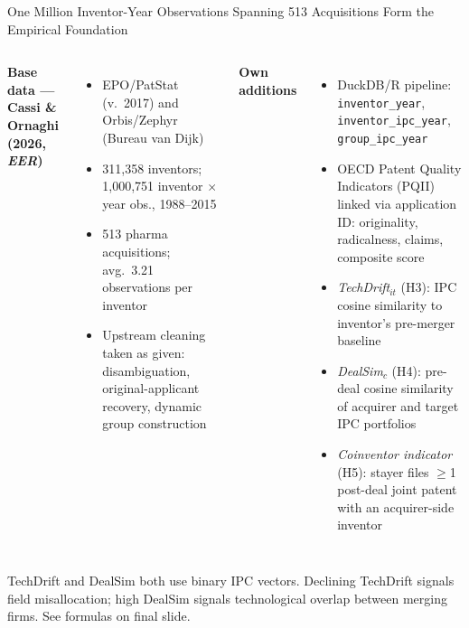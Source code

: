 \documentclass[10pt,aspectratio=169]{beamer}
\begin{document}
\begin{frame}{One Million Inventor-Year Observations Spanning 513 Acquisitions Form the Empirical Foundation}

\begin{columns}[T]

  \textbf{Base data --- Cassi \& Ornaghi (2026, \textit{EER})}
  \begin{itemize}\small
    \item EPO/PatStat (v.\ 2017) and Orbis/Zephyr (Bureau van Dijk)
    \item 311,358 inventors; 1,000,751 inventor $\times$ year obs., 1988--2015
    \item 513 pharma acquisitions; avg.\ 3.21 observations per inventor
    \item Upstream cleaning taken as given: disambiguation, original-applicant recovery, dynamic group construction
  \end{itemize}

  \textbf{Own additions}
  \begin{itemize}\small
    \item DuckDB/R pipeline: \texttt{inventor\_year}, \texttt{inventor\_ipc\_year}, \texttt{group\_ipc\_year}
    \item OECD Patent Quality Indicators (PQII) linked via application ID: originality, radicalness, claims, composite score
    \item \textit{TechDrift}$_{it}$ (H3): IPC cosine similarity to inventor's pre-merger baseline
    \item \textit{DealSim}$_c$ (H4): pre-deal cosine similarity of acquirer and target IPC portfolios
    \item \textit{Coinventor indicator} (H5): stayer files $\geq$1 post-deal joint patent with an acquirer-side inventor
  \end{itemize}

\end{columns}

\vspace{0.6em}
{\footnotesize\color{midgray}\centering
TechDrift and DealSim both use binary IPC vectors. Declining TechDrift signals field misallocation; high DealSim signals technological overlap between merging firms. See formulas on final slide.\par}

\end{frame}
\end{document}
